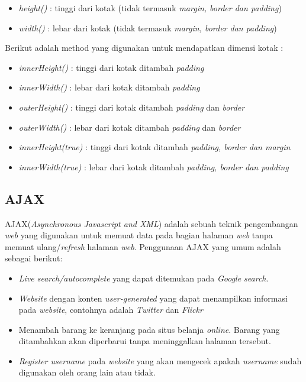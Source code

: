 \begin{itemize}
	\item \textit{height()} : tinggi dari kotak (tidak termasuk \textit{margin, border dan padding})
	\item \textit{width()} : lebar dari kotak (tidak termasuk \textit{margin, border dan padding})
\end{itemize}

Berikut adalah method yang digunakan untuk mendapatkan dimensi kotak :

\begin{itemize}
	\item \textit{innerHeight()} : tinggi dari kotak ditambah \textit{padding}
	\item \textit{innerWidth()} : lebar dari kotak ditambah \textit{padding}
	\item \textit{outerHeight()} : tinggi dari kotak ditambah \textit{padding} dan \textit{border}
	\item \textit{outerWidth()} : lebar dari kotak ditambah \textit{padding} dan \textit{border}
	\item \textit{innerHeight(true)} : tinggi dari kotak ditambah \textit{padding, border dan margin}
	\item \textit{innerWidth(true)} : lebar dari kotak ditambah \textit{padding, border dan padding}
\end{itemize}

\subsection{AJAX}
AJAX(\textit{Asynchronous Javascript and XML}) adalah sebuah teknik pengembangan \textit{web} yang digunakan untuk memuat data pada bagian halaman \textit{web} tanpa memuat ulang/\textit{refresh} halaman \textit{web}. Penggunaan AJAX yang umum adalah sebagai berikut:

\begin{itemize}
	\item \textit{Live search/autocomplete} yang dapat ditemukan pada \textit{Google search}.
	\item \textit{Website} dengan konten \textit{user-generated} yang dapat menampilkan informasi pada \textit{website}, contohnya adalah \textit{Twitter} dan \textit{Flickr}
	\item Menambah barang ke keranjang pada situs belanja \textit{online}. Barang yang ditambahkan akan diperbarui tanpa meninggalkan halaman tersebut.
	\item \textit{Register username} pada \textit{website} yang akan mengecek apakah \textit{username} sudah digunakan oleh orang lain atau tidak.
\end{itemize}

